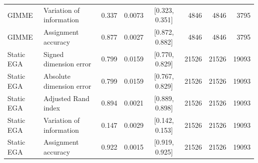 \documentclass[
]{article}
\begin{document}
\begin{landscape}
\begin{table}
\begin{tabular}[t]{llrrcrrr}
GIMME & Variation of information & 0.337 & 0.0073 & {}[0.323, 0.351] & 4846 & 4846 & 3795\\
GIMME & Assignment accuracy & 0.877 & 0.0027 & {}[0.872, 0.882] & 4846 & 4846 & 3795\\
\addlinespace
Static EGA & Signed dimension error & 0.799 & 0.0159 & {}[0.770, 0.829] & 21526 & 21526 & 19093\\
Static EGA & Absolute dimension error & 0.799 & 0.0159 & {}[0.767, 0.829] & 21526 & 21526 & 19093\\
Static EGA & Adjusted Rand index & 0.894 & 0.0021 & {}[0.889, 0.898] & 21526 & 21526 & 19093\\
Static EGA & Variation of information & 0.147 & 0.0029 & {}[0.142, 0.153] & 21526 & 21526 & 19093\\
Static EGA & Assignment accuracy & 0.922 & 0.0015 & {}[0.919, 0.925] & 21526 & 21526 & 19093\\
\bottomrule
\end{tabular}
\end{table}
\clearpage
\begin{table}


\end{table}
\end{landscape}
\end{document}

